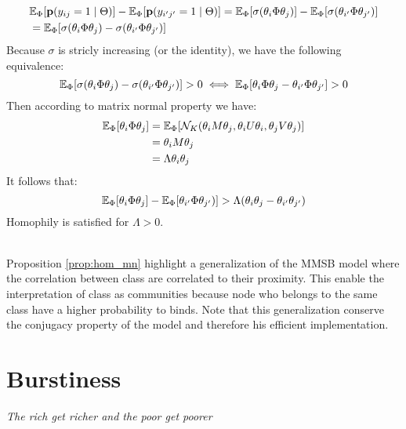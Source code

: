 \documentclass[a4paper, 12pt]{article}
\begin{document}
\begin{align}
&\mathbb{E}_{\Phi}[\mathbf{p}(y_{ij}=1\mid \Theta)] - \mathbb{E}_{\Phi}[\mathbf{p}(y_{i'j'}=1\mid \Theta)] =  \mathbb{E}_{\Phi}[\sigma(\theta_i \Phi \theta_j)] -  \mathbb{E}_{\Phi}[\sigma(\theta_{i'} \Phi \theta_{j'})] \\
&= \mathbb{E}_{\Phi}[\sigma(\theta_i \Phi \theta_j) - \sigma(\theta_{i'} \Phi \theta_{j'})]
\end{align}
Because $\sigma$ is stricly increasing (or the identity), we have the following equivalence:
\begin{equation}
\mathbb{E}_{\Phi}[\sigma(\theta_i \Phi \theta_j) - \sigma(\theta_{i'} \Phi \theta_{j'})] > 0  \iff \mathbb{E}_{\Phi}[\theta_i \Phi \theta_j - \theta_{i'} \Phi \theta_{j'}] > 0 
\end{equation}
Then according to matrix normal property we have:
\begin{align}
\mathbb{E}_{\Phi}[\theta_i \Phi \theta_j] &= \mathbb{E}_{\Phi}[\mathcal{N}_K(\theta_iM\theta_j, \theta_iU\theta_i, \theta_jV\theta_j)] \\
&= \theta_iM\theta_j \\
&= \Lambda \theta_i \theta_j
\end{align}
It follows that:  
\begin{equation}
\mathbb{E}_{\Phi}[\theta_i \Phi \theta_j] - \mathbb{E}_{\Phi}[\theta_{i'} \Phi \theta_{j'})] > \Lambda (\theta_i \theta_j - \theta_{i'} \theta_{j'} )
\end{equation}
Homophily is satisfied for $\Lambda > 0$.

~\\

Proposition \ref{prop:hom_mn} highlight a generalization of the MMSB model where the correlation between class are correlated to their proximity. This enable the interpretation of class as communities because node who belongs to the same class have a higher probability to binds. Note that this generalization conserve the conjugacy property of the model and therefore his efficient implementation.


\section{Burstiness}
\hspace{2em} \emph{The rich get richer and the poor get poorer} ~\\

\end{document}
